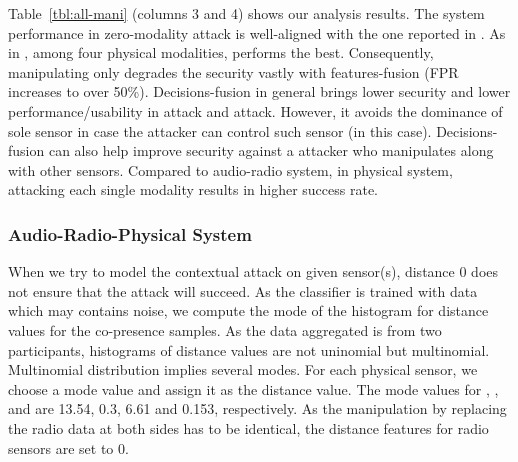 Table~\ref{tbl:all-mani} (columns 3 and 4) shows our analysis results.  The
system performance in zero-modality attack is well-aligned with the one
reported in \cite{ShresthaFC2014}.  As in \cite{ShresthaFC2014}, among four
physical modalities, \altitude performs the best. Consequently, manipulating
only \altitude degrades the security vastly with features-fusion (FPR increases
to over 50\%). Decisions-fusion in general brings lower security and lower
performance/usability in \zeromodal attack and \singlemodal attack.  However,
it avoids the dominance of sole sensor in case the attacker can control such
sensor (\altitude in this case). Decisions-fusion can also help improve
security against a \multimodal attacker who manipulates \altitude along with
other sensors. Compared to audio-radio system, in physical system, attacking
each single modality results in higher success rate. 















\subsubsection{Audio-Radio-Physical System}


 When we try to model
the contextual attack on given sensor(s), distance 0 does not ensure that the attack will succeed.  As
the classifier is trained with data which may contains noise, we compute the
mode of the histogram for distance values for the co-presence samples. As the data
aggregated is from two participants, histograms of distance values are not
uninomial but multinomial. Multinomial distribution implies several modes. For
each physical sensor, we choose a mode value and assign it as the distance value.
The mode values for \altitude, \gas, \humidity and \temperature are 13.54, 0.3,
6.61 and 0.153, respectively. 
As the manipulation by replacing the radio data at
both sides has to be identical, the distance features for radio sensors are set to 0.
















